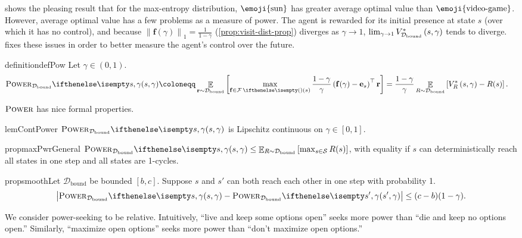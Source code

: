 \documentclass{article}
\newcommand*{\prn}[1]{\left(#1\right)}
\newcommand*{\brx}[1]{\left[#1\right]}
\newcommand*{\defeq}{\coloneqq} %
\newcommand*{\unitvec}[1][s]{\mathbf{e}_{#1}}
\newcommand*{\St}{\mathcal{S}}
\newcommand*{\rf}{\mathbf{r}} %
\newcommand{\stateEnd}{1-cycle}
\newcommand*{\D}{\mathcal{D}} %
\newcommand*{\Dbd}{\D_{\text{bound}}}
\DeclareMathOperator*{\opE}{\mathbb{E}}
\newcommand*{\E}[2]{\opE_{#1}\brx{#2}} %
\newcommand*{\f}{\mathbf{f}} %
\newcommand*{\lone}[1]{\left \lVert#1\right \rVert_1}
\newcommand*{\geom}[1][1]{\frac{#1}{1-\gamma}}
\theoremstyle{definition}
\newcommand*{\sink}{\text{\emoji{video-game}}}
\newcommand*{\farright}{\text{\emoji{sun}}}
\newcommand*{\sink}{\varnothing}
\newcommand*{\farright}{r_{\searrow}}
\begin{document}
 shows the pleasing result that for the max-entropy distribution, $\farright$ has greater average optimal value than $\sink$. However, average optimal value has a few problems as a measure of power. The agent is rewarded for its initial presence at state $s$ (over which it has no control), and because $\lone{\f(\gamma)}=\geom$ (\cref{prop:visit-dist-prop}) diverges as $\gamma \to 1$, $\lim_{\gamma\to 1}\vavg$ tends to diverge.  fixes these issues in order to better measure the agent's control over the future.

\begin{restatable}[$\pwrNoDist$]{definition}{defPow}\label{def:power} Let $\gamma \in (0,1)$.
\begin{align}
    \pwr[s,\gamma][\Dbd]&\defeq \E{\rf\sim\Dbd}{\max_{\f\in \F(s)} \frac{1-\gamma}{\gamma}\prn{\f(\gamma)-\unitvec}^\top \rf}=\frac{1-\gamma}{\gamma}\E{R\sim \Dbd}{\OptVf{s,\gamma}-R(s)}.\label{eq:pwr-def}
\end{align}
\end{restatable} 

$\pwrNoDist$ has nice formal properties.

\begin{restatable}{lem}{ContPower}\label{thm:cont-power} $\pwr[s,\gamma][\Dbd]$ is Lipschitz continuous on $\gamma\in[0,1]$. 
\end{restatable} 

\begin{restatable}{prop}{maxPwrGeneral}\label{lem:max-power-general}
$\pwr[s,\gamma][\Dbd]\leq \E{R\sim \Dbd}{\max_{s\in\St}R(s)}$, with equality if $s$ can deterministically reach all states in one step and all states are {\stateEnd}s. 
\end{restatable}

\begin{restatable}{prop}{smooth}\label{prop:smooth-pwr-dynamics}Let $\Dbd$ be bounded $[b,c]$. Suppose $s$ and $s'$ can both reach each other in one step with probability 1. 
\begin{align}\big|\pwr[s,\gamma][\Dbd]-\pwr[s',\gamma][\Dbd]\big|\leq (c-b)(1-\gamma).
\end{align} 
\end{restatable} 

We consider power-seeking to be relative. Intuitively, ``live and keep some options open'' seeks more power than ``die and keep no options open.'' Similarly, ``maximize open options'' seeks more power than ``don't maximize open options.'' 
\end{document}

